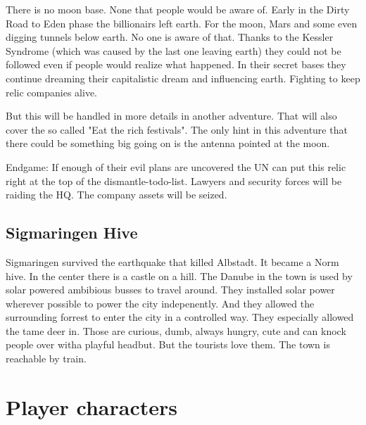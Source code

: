 \begin{sidebarBox}[title=Moon base]

    There is no moon base. None that people would be aware of. Early in the Dirty Road to Eden phase the billionairs left earth. For the moon, Mars and some even digging tunnels below earth. No one is aware of that. Thanks to the Kessler Syndrome (which was caused by the last one leaving earth) they could not be followed even if people would realize what happened.
    In their secret bases they continue dreaming their capitalistic dream and influencing earth. Fighting to keep relic companies alive.

    But this will be handled in more details in another adventure. That will also cover the so called "Eat the rich festivals". The only hint in this adventure that there could be something big going on is the antenna pointed at the moon.
\end{sidebarBox}

Endgame: If enough of their evil plans are uncovered the UN can put this relic right at the top of the dismantle-todo-list. Lawyers and security forces will be raiding the HQ. The company assets will be seized.

\subsection{Sigmaringen Hive}

Sigmaringen survived the earthquake that killed Albstadt. It became a Norm hive. In the center there is a castle on a hill. The Danube in the town is used by solar powered ambibious busses to travel around. They installed solar power wherever possible to power the city indepenently. And they allowed the surrounding forrest to enter the city in a controlled way. They especially allowed the tame deer in. Those are curious, dumb, always hungry, cute and can knock people over witha  playful headbut. But the tourists love them.
The town is reachable by train.



\section{Player characters}

\newpage

